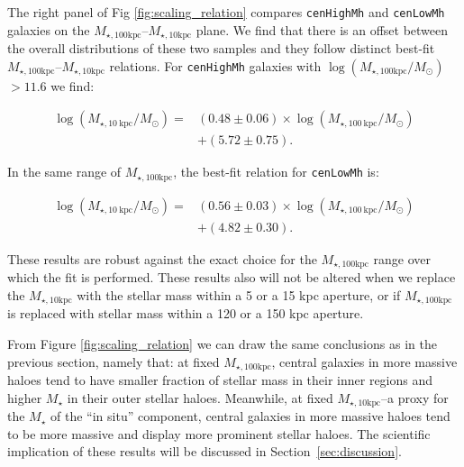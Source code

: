 \documentclass[a4paper,fleqn,usenatbib]{mnras}
\def\rbcg{\texttt{cenHighMh}}
\def\nbcg{\texttt{cenLowMh}}
\def\mstar{{$M_{\star}$}}
\def\mhalo{{$M_{\mathrm{200b}}$}}
\def\minn{{$M_{\star,10\mathrm{kpc}}$}}
\def\mtot{{$M_{\star,100\mathrm{kpc}}$}}
\def\logmtot{{$\log (M_{\star,100\mathrm{kpc}}/M_{\odot})$}}
\begin{document}
    The right panel of Fig \ref{fig:scaling_relation} compares \rbcg{} and \nbcg{}
    galaxies on the \mtot{}--\minn{} plane. 
    We find that there is an offset between the overall distributions of these two
    samples and they follow distinct best-fit \mtot{}--\minn{} relations. 
    For \rbcg{} galaxies with \logmtot{}$>11.6$ we find:
    
    \begin{equation}
        \begin{aligned}
        \log (M_{\star, 10\ \mathrm{kpc}}/M_{\odot}) = & (0.48\pm0.06) \times \log (M_{\star, 100\ \mathrm{kpc}}/M_{\odot}) \\ & +(5.72\pm0.75).
        \end{aligned}
    \end{equation}
    
    \noindent In the same range of \mtot{}, the best-fit relation for \nbcg{} is:
     
    \begin{equation}
        \begin{aligned}
        \log (M_{\star, 10\ \mathrm{kpc}}/M_{\odot}) = & (0.56\pm0.03) \times \log (M_{\star, 100\ \mathrm{kpc}}/M_{\odot}) \\ & +(4.82\pm0.30).
        \end{aligned}
    \end{equation}
    
    These results are robust against the exact choice for the \mtot{} range over which 
    the fit is performed. 
    These results also will not be altered when we replace the \minn{} with the stellar 
    mass within a 5 or a 15 kpc aperture, or if \mtot{} is replaced with stellar mass 
    within a 120 or a 150 kpc aperture.  
    
     
    From Figure \ref{fig:scaling_relation} we can draw the same conclusions as in 
    the previous section, namely that: 
    at fixed \mtot{}, central galaxies in more massive haloes tend to have smaller 
    fraction of stellar mass in their inner regions and higher \mstar{} in their outer
    stellar haloes. 
    Meanwhile, at fixed \minn{}--a proxy for the \mstar{} of the ``in situ'' component,
    central galaxies in more massive haloes tend to be more massive and display more 
    prominent stellar haloes. 
    The scientific implication of these results will be discussed in 
    Section~\ref{sec:discussion}.
    
\end{document}
